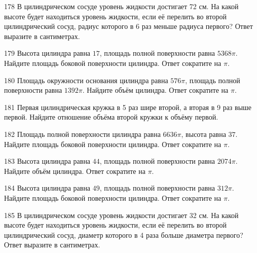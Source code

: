 \documentclass[4apaper]{article}
\begin{document}
\begin{taskBN}{178}
В цилиндрическом сосуде уровень жидкости достигает 72 см. На какой высоте будет находиться уровень жидкости, если её перелить во второй цилиндрический сосуд, радиус которого в 6 раз меньше радиуса первого? Ответ выразите в сантиметрах.
\end{taskBN}

\begin{taskBN}{179}
Высота цилиндра равна $17$, площадь полной поверхности равна $5368\pi$. Найдите площадь боковой поверхности цилиндра. Ответ сократите на $\pi$.
\end{taskBN}

\begin{taskBN}{180}
Площадь окружности основания цилиндра равна $576\pi$, площадь полной поверхности равна $1392\pi$. Найдите объём цилиндра. Ответ сократите на $\pi$.
\end{taskBN}

\begin{taskBN}{181}
 Первая цилиндрическая кружка в 5 раз шире второй, а вторая в 9 раз выше первой. Найдите отношение объёма второй кружки к объёму первой.
\end{taskBN}

\begin{taskBN}{182}
Площадь полной поверхности цилиндра равна $6636\pi$, высота равна $37$. Найдите площадь боковой поверхности цилиндра. Ответ сократите на $\pi$.
\end{taskBN}

\begin{taskBN}{183}
Высота цилиндра равна $44$, площадь полной поверхности равна $2074\pi$. Найдите объём цилиндра. Ответ сократите на $\pi$.
\end{taskBN}

\begin{taskBN}{184}
Высота цилиндра равна $49$, площадь полной поверхности равна $312\pi$. Найдите площадь боковой поверхности цилиндра. Ответ сократите на $\pi$.
\end{taskBN}

\begin{taskBN}{185}
В цилиндрическом сосуде уровень жидкости достигает 32 см. На какой высоте будет находиться уровень жидкости, если её перелить во второй цилиндрический сосуд, диаметр которого в 4 раза больше диаметра первого? Ответ выразите в сантиметрах.
\end{taskBN}
\end{document}
